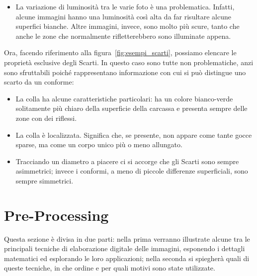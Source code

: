 \begin{itemize}

  \item La variazione di luminosità tra le varie foto è una problematica.
    Infatti, alcune immagini hanno una luminosità così alta da far risultare alcune superfici bianche.
    Altre immagini, invece, sono molto più scure, tanto che anche le zone che normalmente rifletterebbero sono illuminate appena.

\end{itemize}

Ora, facendo riferimento alla figura~\ref{fig:esempi_scarti}, possiamo elencare le proprietà esclusive degli Scarti.
In questo caso sono tutte non problematiche, anzi sono sfruttabili poiché rappresentano informazione con cui si può distingue uno scarto da un conforme:
\begin{itemize}
  \item La colla ha alcune caratteristiche particolari: ha un colore bianco-verde solitamente più chiaro della superficie della carcassa e presenta sempre delle zone con dei riflessi.

  \item La colla è localizzata.
    Significa che, se presente, non appare come tante gocce sparse, ma come un corpo unico più o meno allungato.

  \item Tracciando un diametro a piacere ci si accorge che gli Scarti sono sempre asimmetrici; invece i conformi, a meno di piccole differenze superficiali, sono sempre simmetrici.

\end{itemize}



\clearpage
\section{Pre-Processing}
Questa sezione è divisa in due parti: nella prima verranno illustrate alcune tra le principali tecniche di elaborazione digitale delle immagini, esponendo i dettagli matematici ed esplorando le loro applicazioni; nella seconda si spiegherà quali di queste tecniche, in che ordine e per quali motivi sono state utilizzate.

